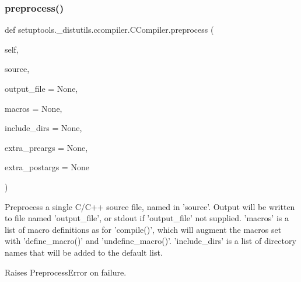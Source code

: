 \mbox{\label{classsetuptools_1_1__distutils_1_1ccompiler_1_1CCompiler_a78824b38005606810011f2a9ab380221}} 
\subsubsection{\texorpdfstring{preprocess()}{preprocess()}}
{\footnotesize\ttfamily def setuptools.\+\_\+distutils.\+ccompiler.\+C\+Compiler.\+preprocess (\begin{DoxyParamCaption}\item[{}]{self,  }\item[{}]{source,  }\item[{}]{output\+\_\+file = {\ttfamily None},  }\item[{}]{macros = {\ttfamily None},  }\item[{}]{include\+\_\+dirs = {\ttfamily None},  }\item[{}]{extra\+\_\+preargs = {\ttfamily None},  }\item[{}]{extra\+\_\+postargs = {\ttfamily None} }\end{DoxyParamCaption})}

\begin{DoxyVerb}Preprocess a single C/C++ source file, named in 'source'.
Output will be written to file named 'output_file', or stdout if
'output_file' not supplied.  'macros' is a list of macro
definitions as for 'compile()', which will augment the macros set
with 'define_macro()' and 'undefine_macro()'.  'include_dirs' is a
list of directory names that will be added to the default list.

Raises PreprocessError on failure.
\end{DoxyVerb}
 \mbox{\label{classsetuptools_1_1__distutils_1_1ccompiler_1_1CCompiler_ab916355b3dd0f8723913927bdf79a882}} 

